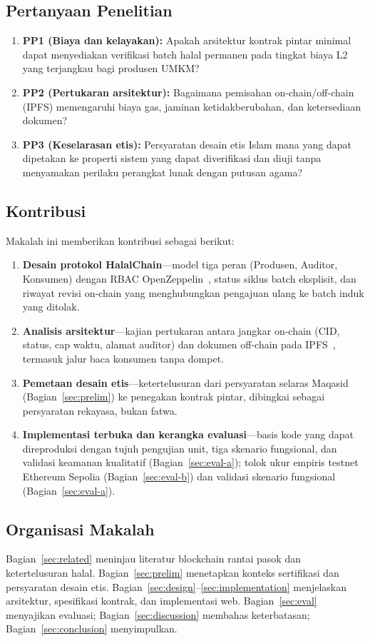 \subsection{Pertanyaan Penelitian}
\begin{enumerate}
  \item \textbf{PP1 (Biaya dan kelayakan):} Apakah arsitektur kontrak pintar minimal dapat menyediakan verifikasi batch halal permanen pada tingkat biaya L2 yang terjangkau bagi produsen UMKM?
  \item \textbf{PP2 (Pertukaran arsitektur):} Bagaimana pemisahan on-chain/off-chain (IPFS) memengaruhi biaya gas, jaminan ketidakberubahan, dan ketersediaan dokumen?
  \item \textbf{PP3 (Keselarasan etis):} Persyaratan desain etis Islam mana yang dapat dipetakan ke properti sistem yang dapat diverifikasi dan diuji tanpa menyamakan perilaku perangkat lunak dengan putusan agama?
\end{enumerate}

\subsection{Kontribusi}
Makalah ini memberikan kontribusi sebagai berikut:
\begin{enumerate}
  \item \textbf{Desain protokol HalalChain}---model tiga peran (Produsen, Auditor, Konsumen) dengan RBAC OpenZeppelin~\cite{openzeppelin2024access}, status siklus batch eksplisit, dan riwayat revisi on-chain yang menghubungkan pengajuan ulang ke batch induk yang ditolak.
  \item \textbf{Analisis arsitektur}---kajian pertukaran antara jangkar on-chain (CID, status, cap waktu, alamat auditor) dan dokumen off-chain pada IPFS~\cite{benet2014ipfs,caro2018blockchain}, termasuk jalur baca konsumen tanpa dompet.
  \item \textbf{Pemetaan desain etis}---ketertelusuran dari persyaratan selaras Maqasid (Bagian~\ref{sec:prelim}) ke penegakan kontrak pintar, dibingkai sebagai persyaratan rekayasa, bukan fatwa.
  \item \textbf{Implementasi terbuka dan kerangka evaluasi}---basis kode yang dapat direproduksi dengan tujuh pengujian unit, tiga skenario fungsional, dan validasi keamanan kualitatif (Bagian~\ref{sec:eval-a}); tolok ukur empiris testnet Ethereum Sepolia (Bagian~\ref{sec:eval-b}) dan validasi skenario fungsional (Bagian~\ref{sec:eval-a}).
\end{enumerate}

\subsection{Organisasi Makalah}
Bagian~\ref{sec:related} meninjau literatur blockchain rantai pasok dan ketertelusuran halal.
Bagian~\ref{sec:prelim} menetapkan konteks sertifikasi dan persyaratan desain etis.
Bagian~\ref{sec:design}--\ref{sec:implementation} menjelaskan arsitektur, spesifikasi kontrak, dan implementasi web.
Bagian~\ref{sec:eval} menyajikan evaluasi; Bagian~\ref{sec:discussion} membahas keterbatasan; Bagian~\ref{sec:conclusion} menyimpulkan.
